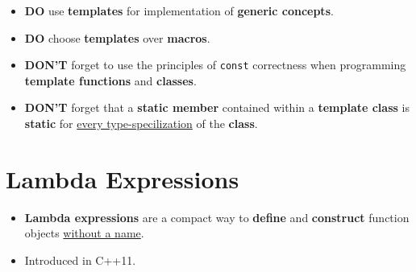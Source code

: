 \documentclass[10pt]{article}
\newcommand{\pbreak}{\vspace{30pt}}
\newcommand{\newbp}{%
  \newpage
  \mbox{}
  \newpage
}
\begin{document}
\newpage

\begin{itemize}
	\item \textbf{DO} use \textbf{templates} for implementation of \textbf{generic concepts}.
	\item \textbf{DO} choose \textbf{templates} over \textbf{macros}.
		\pbreak

	\item \textbf{DON'T} forget to use the principles of \verb|const| correctness when programming \textbf{template functions} and \textbf{classes}.
	\item \textbf{DON'T} forget that a \textbf{static member} contained within a \textbf{template class} is \textbf{static} for \underline{every type-specilization} of the \textbf{class}.
\end{itemize}

\newbp

\section{Lambda Expressions}
\begin{itemize}
	\item \textbf{Lambda expressions} are a compact way to \textbf{define} and \textbf{construct} function objects \underline{without a name}.

	\item Introduced in C++11.
\end{itemize}

\pbreak
\end{document}
